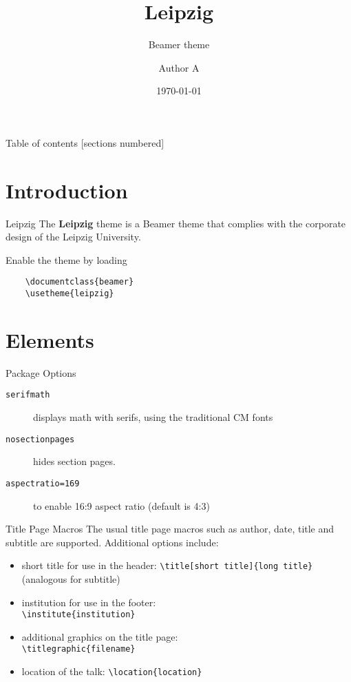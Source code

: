 \documentclass[aspectratio=169]{beamer}
\title[Leipzig]{Leipzig}
\subtitle[Beamer Theme]{Beamer theme}
\author{Author A}
\institute{Institute of Mathematics}
\date{\today}
\begin{document}
\maketitle

\begin{frame}{Table of contents}
  [sections numbered]
  \tableofcontents[hideallsubsections]
\end{frame}

\section{Introduction}

\begin{frame}[fragile]{Leipzig}
The \textbf{Leipzig} theme is a Beamer theme that complies with the corporate design of the Leipzig University.

Enable the theme by loading
\begin{verbatim}
    \documentclass{beamer}
    \usetheme{leipzig}
\end{verbatim}

\end{frame}

\section{Elements}
\begin{frame}[fragile]{Package Options}
\begin{description}
\item[\texttt{serifmath}] displays math with serifs, using the
  traditional CM fonts
\item[\texttt{nosectionpages}] hides section pages.
\item[\texttt{aspectratio=169}] to enable 16:9 aspect ratio (default is 4:3)
\end{description}
\end{frame}

\begin{frame}[fragile]{Title Page Macros}
The usual title page macros such as author, date, title and subtitle are supported.
Additional options include:
\begin{itemize}
\item short title for use in the header: \verb+\title[short title]{long title}+ (analogous for subtitle)
\item institution for use in the footer: \\ \verb+\institute{institution}+
\item additional graphics on the title page: \\ \verb+\titlegraphic{filename}+
\item location of the talk: \verb+\location{location}+
\end{itemize}
\end{frame}
\end{document}
